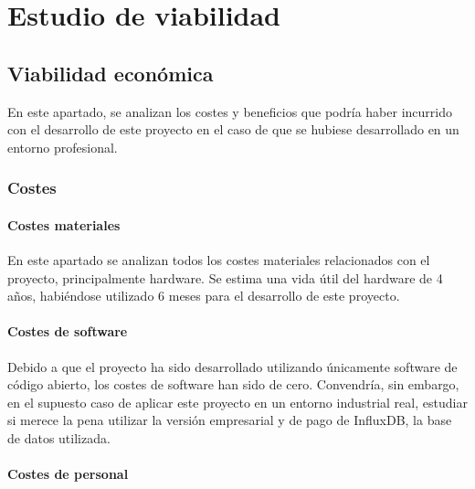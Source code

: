 
\section{Estudio de viabilidad}

\subsection{Viabilidad económica}

En este apartado, se analizan los costes y beneficios que podría haber incurrido con el desarrollo 
de este proyecto en el caso de que se hubiese desarrollado en un entorno profesional.

\subsubsection{Costes}

\paragraph{Costes materiales}
En este apartado se analizan todos los costes materiales relacionados con el proyecto, principalmente 
hardware. Se estima una vida útil del hardware de 4 años, habiéndose utilizado 6 meses para 
el desarrollo de este proyecto.


\paragraph{Costes de software}
Debido a que el proyecto ha sido desarrollado utilizando únicamente software de código abierto,
los costes de software han sido de cero. Convendría, sin embargo, en el supuesto caso de aplicar
este proyecto en un entorno industrial real, estudiar si merece la pena utilizar la versión empresarial 
y de pago de InfluxDB, la base de datos utilizada.

\paragraph{Costes de personal}

